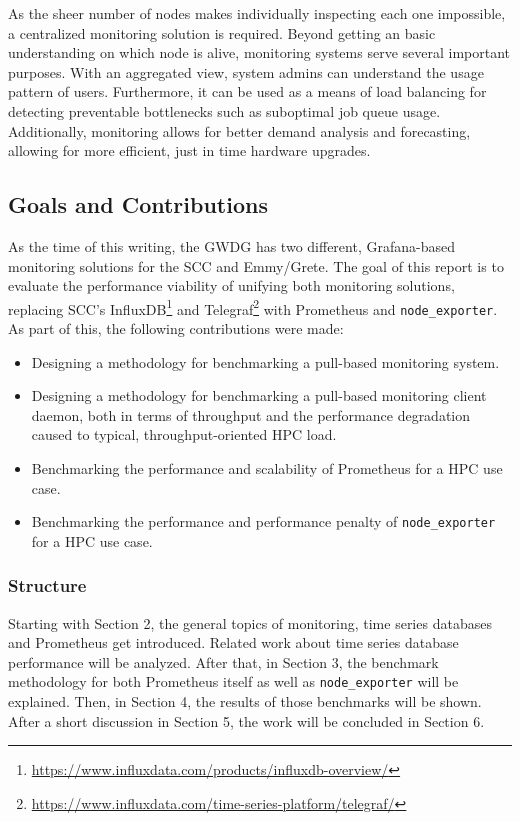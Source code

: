 As the sheer number of nodes makes individually inspecting each one impossible, a centralized
monitoring solution is required. Beyond getting an basic understanding on which node is alive, 
monitoring systems serve several important purposes. With an aggregated view, system admins can
understand the usage pattern of users. Furthermore, it can be used as a means of load balancing 
for detecting preventable bottlenecks such as suboptimal job queue usage. Additionally, monitoring
allows for better demand analysis and forecasting, allowing for more efficient, just in time 
hardware upgrades.

\subsection{Goals and Contributions}

As the time of this writing, the GWDG has two different, Grafana-based monitoring solutions for 
the \ac{SCC} and Emmy/Grete. The goal of this report is to evaluate the performance viability of
unifying both monitoring solutions, replacing \ac{SCC}'s InfluxDB\footnote{
\url{https://www.influxdata.com/products/influxdb-overview/}} and Telegraf\footnote{
\url{https://www.influxdata.com/time-series-platform/telegraf/}} with Prometheus and 
\texttt{node\_exporter}.
As part of this, the following contributions were made:
\begin{itemize}
\item Designing a methodology for benchmarking a pull-based monitoring system.
\item Designing a methodology for benchmarking a pull-based monitoring client daemon, both in 
terms of throughput and the performance degradation caused to typical, throughput-oriented 
\ac{HPC} load.
\item Benchmarking the performance and scalability of Prometheus for a \ac{HPC} use case.
\item Benchmarking the performance and performance penalty of \texttt{node\_exporter} for a 
\ac{HPC} use case.
\end{itemize}

\subsubsection{Structure}
Starting with Section 2, the general topics of monitoring, time series databases and
Prometheus get introduced. Related work about time series database performance will be analyzed.
After that, in Section 3, the benchmark methodology for both Prometheus itself as well as
\texttt{node\_exporter} will be explained. Then, in Section 4, the results of those benchmarks
will be shown. After a short discussion in Section 5, the work will be concluded in Section 6.

